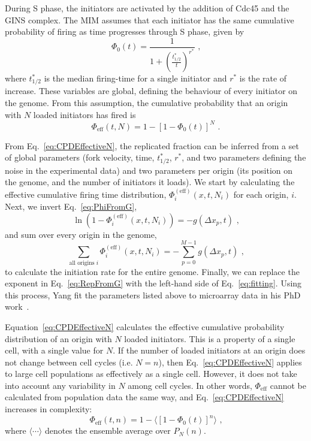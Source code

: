 {		During S phase, the initiators are activated by the addition of Cdc45 and the GINS complex.
		The MIM assumes that each initiator has the same cumulative probability of firing as time progresses through S phase, given by
		\begin{equation}\label{eq:CPDInitiator}
			\Phi_0(t) = \frac{1}{1+\left(\frac{t^*_{1/2}}{t}\right)^{r^*}}\text{ ,}
		\end{equation}
		where $t^*_{1/2}$ is the median firing-time for a single initiator and $r^*$ is the rate of increase.
		These variables are global, defining the behaviour of every initiator on the genome.
		From this assumption, the cumulative probability that an origin with $N$ loaded initiators has fired is
		\begin{equation} \label{eq:CPDEffectiveN}
			\Phi_{\text{eff}}(t,N) = 1 - \left[1 - \Phi_0(t)\right]^N\text{ .}
		\end{equation}
		
		From Eq.~\ref{eq:CPDEffectiveN}, the replicated fraction can be inferred from a set of global parameters (fork velocity, time, $t^*_{1/2}$, $r^*$, and two parameters defining the noise in the experimental data) and two parameters per origin (its position on the genome, and the number of initiators it loads).
		We start by calculating the effective cumulative firing time distribution, $\Phi_{i}^{(\text{eff})}(x,t,N_i)$ for each origin, $i$.
		Next, we invert Eq.~\ref{eq:PhiFromG},
		\begin{equation}
			\ln \left( 1- \Phi_{i}^{(\text{eff})}(x,t,N_i)\right) = - g(\Delta x_p, t) \text{ ,}
		\end{equation}
		and sum over every origin in the genome,
		\begin{equation} \label{eq:fitting}
			\sum\limits_{\text{all origins }i}\Phi_{i}^{(\text{eff})}(x,t,N_i) = - \sum\limits_{p=0}^{M-1} g(\Delta x_p,t) \text{ ,}
		\end{equation}
		to calculate the initiation rate for the entire genome.
		Finally, we can replace the exponent in Eq.~\ref{eq:RepFromG} with the left-hand side of Eq.~\ref{eq:fitting}.
		Using this process, Yang fit the parameters listed above to microarray data in his PhD work~\cite{ScottsThesis}.
	
		Equation~\ref{eq:CPDEffectiveN} calculates the effective cumulative probability distribution of an origin with $N$ loaded initiators.
		This is a property of a single cell, with a single value for $N$.
		If the number of loaded initiators at an origin does not change between cell cycles (i.e. $N=n$), then Eq.~\ref{eq:CPDEffectiveN} applies to large cell populations as effectively as a single cell.
		However, it does not take into account any variability in $N$ among cell cycles.
		In other words, $\Phi_{\text{eff}}$ cannot be calculated from population data the same way, and Eq.~\ref{eq:CPDEffectiveN} increases in complexity:
		\begin{equation} \label{eq:CPDEffectivenTemp}
			\Phi_{\text{eff}}(t,n) = 1 - \langle\left[1 - \Phi_0(t)\right]^n\rangle\text{ ,}
		\end{equation}
		where $\langle \cdots \rangle$ denotes the ensemble average over $P_N(n)$.
		
}
